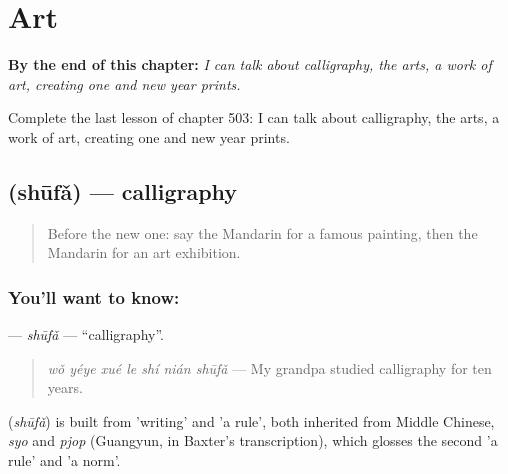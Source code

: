 
\chapter{Art}
\label{ch:zh-art}

\begin{chapteropening}
\textbf{By the end of this chapter:} \emph{I can talk about calligraphy, the arts, a work of art, creating one and new year prints.}

Complete the last lesson of chapter 503: I can talk about calligraphy, the arts, a work of art, creating one and new year prints.
\end{chapteropening}

\section[\texorpdfstring{\zh{书法} (shūfǎ)}{书法 (shūfǎ)}]{ (shūfǎ) — calligraphy}

\label{lesson:ZH-C503-shufa}



\begin{quote}
Before the new one: say the Mandarin for a famous painting, then the Mandarin for an art exhibition.
\end{quote}

\subsection*{You'll want to know: }
\textbf{} — \emph{shūfǎ} — \textquotedblleft{}calligraphy\textquotedblright{}.

\begin{quote}
\emph{wǒ yéye xué le shí nián shūfǎ} — My grandpa studied calligraphy for ten years.
\end{quote}

\begin{cousinweb}
\textbf{} (\emph{shūfǎ}) is built from  'writing' and  'a rule', both inherited from Middle Chinese, \emph{syo} and \emph{pjop} (Guangyun, in Baxter's transcription), which glosses the second 'a rule' and 'a norm'.
\end{cousinweb}

